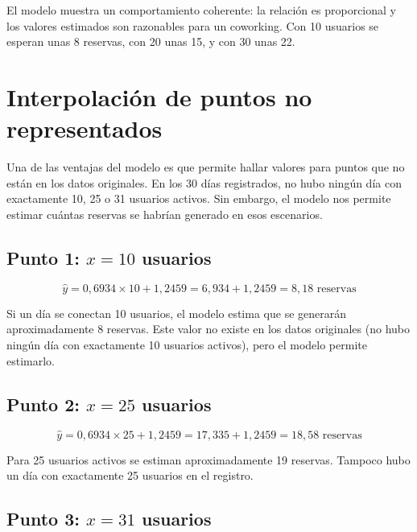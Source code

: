 \documentclass[12pt,a4paper]{article}
\begin{document}
El modelo muestra un comportamiento coherente: la relación es proporcional y los valores estimados son razonables para un coworking. Con 10 usuarios se esperan unas 8 reservas, con 20 unas 15, y con 30 unas 22.

\section{Interpolación de puntos no representados}

Una de las ventajas del modelo es que permite hallar valores para puntos que no están en los datos originales. En los 30 días registrados, no hubo ningún día con exactamente 10, 25 o 31 usuarios activos. Sin embargo, el modelo nos permite estimar cuántas reservas se habrían generado en esos escenarios.

\subsection{Punto 1: $x = 10$ usuarios}

\vspace{4pt}
$$\hat{y} = 0{,}6934 \times 10 + 1{,}2459 = 6{,}934 + 1{,}2459 = 8{,}18 \text{ reservas}$$
\vspace{4pt}

Si un día se conectan 10 usuarios, el modelo estima que se generarán aproximadamente 8 reservas. Este valor no existe en los datos originales (no hubo ningún día con exactamente 10 usuarios activos), pero el modelo permite estimarlo.

\subsection{Punto 2: $x = 25$ usuarios}

\vspace{4pt}
$$\hat{y} = 0{,}6934 \times 25 + 1{,}2459 = 17{,}335 + 1{,}2459 = 18{,}58 \text{ reservas}$$
\vspace{4pt}

Para 25 usuarios activos se estiman aproximadamente 19 reservas. Tampoco hubo un día con exactamente 25 usuarios en el registro.

\subsection{Punto 3: $x = 31$ usuarios}
\end{document}
